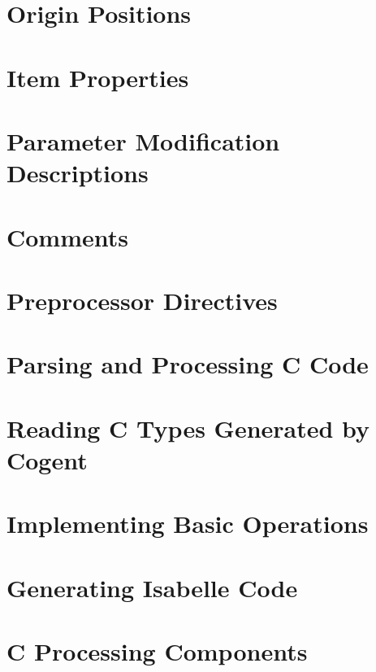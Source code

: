 \documentclass[a4paper]{report}
\begin{document}
\section{Origin Positions}
\label{impl-origin}


\section{Item Properties}
\label{impl-itemprops}


\section{Parameter Modification Descriptions}
\label{impl-parmod}


\section{Comments}
\label{impl-comments}


\section{Preprocessor Directives}
\label{impl-preprocessor}


\section{Parsing and Processing C Code}
\label{impl-ccode}


\section{Reading C Types Generated by Cogent}
\label{impl-ctypinfo}


\section{Implementing Basic Operations}
\label{impl-operations}


\section{Generating Isabelle Code}
\label{impl-isabelle}


\section{C Processing Components}
\label{impl-ccomps}

\end{document}

